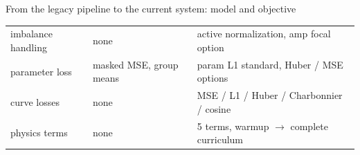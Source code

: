 \begin{frame}{From the legacy pipeline to the current system: model and objective}
\begin{tabular}{@{}l p{4.9cm} p{6.1cm}@{}}
    imbalance handling  & none                                        & active normalization, amp focal option \\
    \addlinespace[3pt]
    parameter loss      & masked MSE, group means                     & param L1 standard, Huber / MSE options \\
    curve losses        & none                                        & MSE / L1 / Huber / Charbonnier / cosine \\
    physics terms       & none                                        & 5 terms, warmup $\to$ complete curriculum \\
    \bottomrule
  \end{tabular}
\end{frame}

